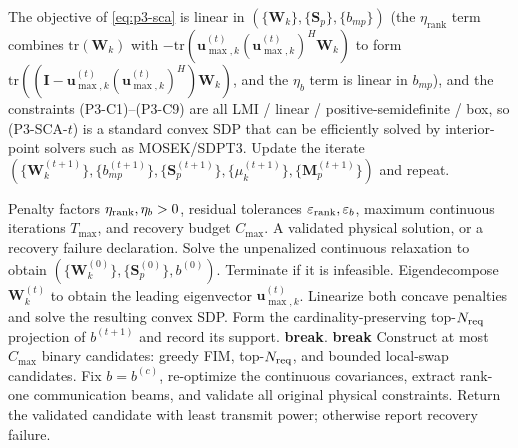 \documentclass[12pt,a4paper]{article}
\newcommand{\vect}[1]{\mathbf{#1}}
\newcommand{\mat}[1]{\mathbf{#1}}
\newcommand{\tr}{\text{tr}}
\begin{document}
The objective of \eqref{eq:p3-sca} is linear in $(\{\mat{W}_k\}, \{\mat{S}_p\}, \{b_{mp}\})$ (the $\eta_{\text{rank}}$ term combines $\tr(\mat{W}_k)$ with $-\tr(\vect{u}_{\max,k}^{(t)}(\vect{u}_{\max,k}^{(t)})^H \mat{W}_k)$ to form $\tr((\mat{I} - \vect{u}_{\max,k}^{(t)}(\vect{u}_{\max,k}^{(t)})^H) \mat{W}_k)$, and the $\eta_b$ term is linear in $b_{mp}$), and the constraints (P3-C1)--(P3-C9) are all LMI / linear / positive-semidefinite / box, so (P3-SCA-$t$) is a standard convex SDP that can be efficiently solved by interior-point solvers such as MOSEK/SDPT3. Update the iterate $(\{\mat{W}_k^{(t+1)}\}, \{b_{mp}^{(t+1)}\}, \{\mat{S}_p^{(t+1)}\}, \{\mu_k^{(t+1)}\}, \{\mat{M}_p^{(t+1)}\})$ and repeat.

\begin{algorithm}[htbp]
\caption{Dual DC-SCA With Verified Binary Recovery}
\label{alg:sca-joint}
\begin{algorithmic}[1]
\Require Penalty factors $\eta_{\rm rank},\eta_b>0$, residual tolerances $\varepsilon_{\rm rank},\varepsilon_b$, maximum continuous iterations $T_{\max}$, and recovery budget $C_{\max}$.
\Ensure A validated physical solution, or a recovery failure declaration.
\State Solve the unpenalized continuous relaxation to obtain $(\{\mat{W}_k^{(0)}\},\{\mat{S}_p^{(0)}\},b^{(0)})$. Terminate if it is infeasible.
        \State Eigendecompose $\mat{W}_k^{(t)}$ to obtain the leading eigenvector $\vect{u}_{\max,k}^{(t)}$.
    \EndFor
    \State Linearize both concave penalties and solve the resulting convex SDP.
    \State Form the cardinality-preserving top-$N_{\rm req}$ projection of $b^{(t+1)}$ and record its support.
    \If{$\sum_k\rho(\mat{W}_k^{(t+1)})\leq\varepsilon_{\rm rank}$ and $\max_{m,p}\min\{b_{mp}^{(t+1)},1-b_{mp}^{(t+1)}\}\leq\varepsilon_b$}
        \State \textbf{break}.
    \EndIf
        \State \textbf{break} 
    \EndIf
\EndFor
\State Construct at most $C_{\max}$ binary candidates: greedy FIM, top-$N_{\rm req}$, and bounded local-swap candidates.
    \State Fix $b=b^{(c)}$, re-optimize the continuous covariances, extract rank-one communication beams, and validate all original physical constraints.
\EndFor
\State Return the validated candidate with least transmit power; otherwise report recovery failure.
\end{algorithmic}
\end{algorithm}
\end{document}
